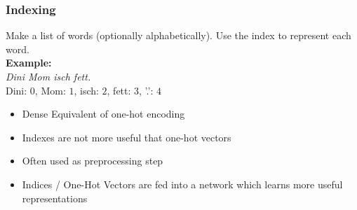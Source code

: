 \subsubsection{Indexing}
Make a list of words (optionally alphabetically). Use the index to represent each word.\\
\textbf{Example:}\\
\textit{Dini Mom isch fett.}\\
Dini: $0$, Mom: $1$, isch: $2$, fett: $3$, '.': $4$
\begin{itemize}
    \item Dense Equivalent of one-hot encoding
    \item Indexes are not more useful that one-hot vectors
    \item Often used as preprocessing step
    \item Indices / One-Hot Vectors are fed into a network which learns more useful representations
\end{itemize}

